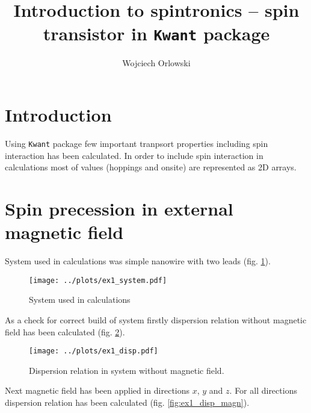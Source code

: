 \documentclass[a4paper, 12pt]{article}
\author{Wojciech Orlowski}
\title{Introduction to spintronics – spin transistor in \texttt{Kwant} package}
\begin{document}
\maketitle

\section*{Introduction}

Using \texttt{Kwant} package few important tranpsort properties including spin interaction has been calculated.
In order to include spin interaction in calculations most of values (hoppings and onsite) are represented as 2D arrays.

\section*{Spin precession in external magnetic field}

System used in calculations was simple nanowire with two leads (fig. \ref{fig:ex1_system}).

\begin{figure}[h]
    \begin{center}
        \texttt{[image: ../plots/ex1\_system.pdf]}
    \end{center}
    \caption{System used in calculations}
    \label{fig:ex1_system}
\end{figure}

As a check for correct build of system firstly dispersion relation without magnetic field has been calculated (fig. \ref{fig:ex1_disp}).

\begin{figure}[H]
    \begin{center}
        \texttt{[image: ../plots/ex1\_disp.pdf]}
    \end{center}
    \caption{Dispersion relation in system without magnetic field.}
    \label{fig:ex1_disp}
\end{figure}

Next magnetic field has been applied in directions $x$, $y$ and $z$.
For all directions dispersion relation has been calculated (fig. \ref{fig:ex1_disp_magn}).
\end{document}
